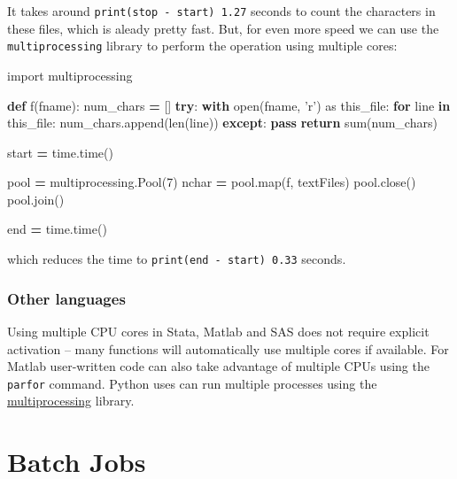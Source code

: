 \documentclass[]{book}
\newenvironment{Shaded}{\begin{snugshade}}{\end{snugshade}}
\newcommand{\KeywordTok}[1]{\textcolor[rgb]{0.13,0.29,0.53}{\textbf{#1}}}
\newcommand{\DecValTok}[1]{\textcolor[rgb]{0.00,0.00,0.81}{#1}}
\newcommand{\StringTok}[1]{\textcolor[rgb]{0.31,0.60,0.02}{#1}}
\newcommand{\ImportTok}[1]{#1}
\newcommand{\ControlFlowTok}[1]{\textcolor[rgb]{0.13,0.29,0.53}{\textbf{#1}}}
\newcommand{\OperatorTok}[1]{\textcolor[rgb]{0.81,0.36,0.00}{\textbf{#1}}}
\newcommand{\BuiltInTok}[1]{#1}
\newcommand{\NormalTok}[1]{#1}
\begin{document}
It takes around \texttt{print(stop\ -\ start)\ 1.27} seconds to count
the characters in these files, which is aleady pretty fast. But, for
even more speed we can use the \texttt{multiprocessing} library to
perform the operation using multiple cores:

\begin{Shaded}
\begin{Highlighting}[]
\ImportTok{import}\NormalTok{ multiprocessing}

\KeywordTok{def}\NormalTok{ f(fname):}
\NormalTok{    num_chars }\OperatorTok{=}\NormalTok{ []}
    \ControlFlowTok{try}\NormalTok{:}
        \ControlFlowTok{with} \BuiltInTok{open}\NormalTok{(fname, }\StringTok{'r'}\NormalTok{) }\ImportTok{as}\NormalTok{ this_file:}
            \ControlFlowTok{for}\NormalTok{ line }\KeywordTok{in}\NormalTok{ this_file:}
\NormalTok{                num_chars.append(}\BuiltInTok{len}\NormalTok{(line))}
    \ControlFlowTok{except}\NormalTok{:}
        \ControlFlowTok{pass}
    \ControlFlowTok{return} \BuiltInTok{sum}\NormalTok{(num_chars)}

\NormalTok{start }\OperatorTok{=}\NormalTok{ time.time()}

\NormalTok{pool }\OperatorTok{=}\NormalTok{ multiprocessing.Pool(}\DecValTok{7}\NormalTok{)}
\NormalTok{nchar }\OperatorTok{=}\NormalTok{ pool.}\BuiltInTok{map}\NormalTok{(f, textFiles)}
\NormalTok{pool.close()}
\NormalTok{pool.join()}

\NormalTok{end }\OperatorTok{=}\NormalTok{ time.time()}
\end{Highlighting}
\end{Shaded}

which reduces the time to \texttt{print(end\ -\ start)\ 0.33} seconds.

\subsection{Other languages}\label{other-languages}

Using multiple CPU cores in Stata, Matlab and SAS does not require
explicit activation -- many functions will automatically use multiple
cores if available. For Matlab user-written code can also take advantage
of multiple CPUs using the \texttt{parfor} command. Python uses can run
multiple processes using the
\href{https://docs.python.org/2/library/multiprocessing.html}{multiprocessing}
library.

\chapter{Batch Jobs}\label{batch-jobs}
\end{document}
